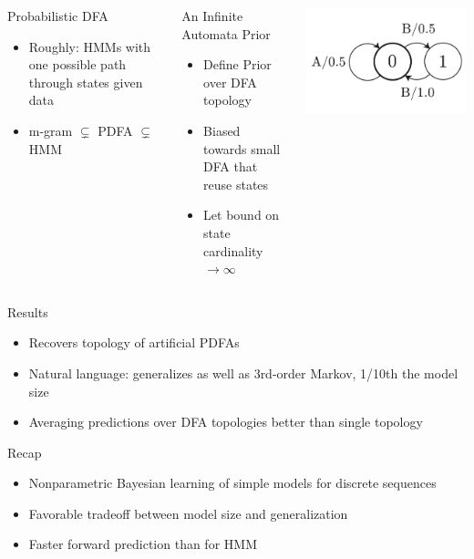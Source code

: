 \documentclass[16pt]{beamer}
\begin{document}
\begin{frame}
	\begin{columns}[top]
			\begin{block}{Probabilistic DFA}
				\begin{itemize}
					\item{Roughly: HMMs with one possible path through states given data}
					\item{m-gram $\subsetneq$ PDFA $\subsetneq$ HMM}
				\end{itemize}
			\end{block}
			\begin{block}{An Infinite Automata Prior}
				\begin{itemize}
					\item{Define Prior over DFA topology}
					\item{Biased towards small DFA that reuse states}
					\item{Let bound on state cardinality $\rightarrow \infty$}
				\end{itemize}
			\end{block}
			\includegraphics[scale=0.8]{even.pdf}
	\end{columns}
\end{frame}

\begin{frame}
	\begin{block}{Results}
		\begin{itemize}
			\item{Recovers topology of artificial PDFAs}
			\item{Natural language: generalizes as well as 3rd-order Markov, 1/10th the model size}
			\item{Averaging predictions over DFA topologies better than single topology}
		\end{itemize}
	\end{block}
	\begin{block}{Recap}
		\begin{itemize}
			\item{Nonparametric Bayesian learning of simple models for discrete sequences}
			\item{Favorable tradeoff between model size and generalization}
			\item{Faster forward prediction than for HMM}
		\end{itemize}
	\end{block}
\end{frame}
\end{document}
